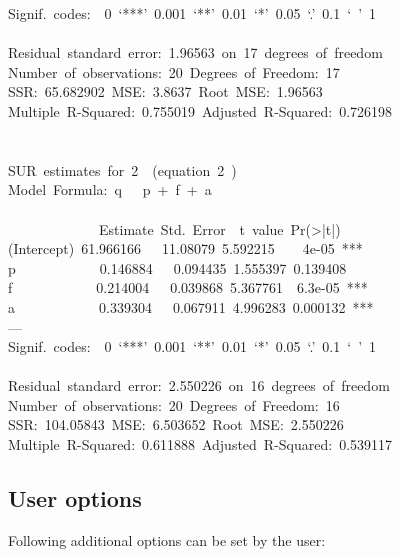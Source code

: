 {Signif.~codes:~~0~`***'~0.001~`**'~0.01~`*'~0.05~`.'~0.1~`~'~1~\\
~\\
Residual~standard~error:~1.96563~on~17~degrees~of~freedom~\\
Number~of~observations:~20~Degrees~of~Freedom:~17~\\
SSR:~65.682902~MSE:~3.8637~Root~MSE:~1.96563~\\
Multiple~R-Squared:~0.755019~Adjusted~R-Squared:~0.726198~\\
~\\
~\\
SUR~estimates~for~2~~(equation~2~)~\\
Model~Formula:~q~~~p~+~f~+~a\\
\\
\mbox{}~~~~~~~~~~~~~Estimate~Std.~Error~~t~value~Pr(>|t|)~\\
(Intercept)~61.966166~~~11.08079~5.592215~~~~4e-05~***~\\
p~~~~~~~~~~~~0.146884~~~0.094435~1.555397~0.139408~\\
f~~~~~~~~~~~~0.214004~~~0.039868~5.367761~~6.3e-05~***~\\
a~~~~~~~~~~~~0.339304~~~0.067911~4.996283~0.000132~***~\\
---~\\
Signif.~codes:~~0~`***'~0.001~`**'~0.01~`*'~0.05~`.'~0.1~`~'~1~\\
~\\
Residual~standard~error:~2.550226~on~16~degrees~of~freedom~\\
Number~of~observations:~20~Degrees~of~Freedom:~16~\\
SSR:~104.05843~MSE:~6.503652~Root~MSE:~2.550226~\\
Multiple~R-Squared:~0.611888~Adjusted~R-Squared:~0.539117~\\
}



\subsection{User options}

Following additional options can be set by the user:

